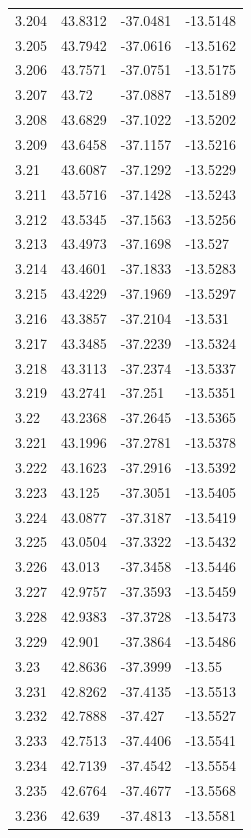 \begin{tabular}{llll}
3.204 & 43.8312 & -37.0481 & -13.5148 \\
3.205 & 43.7942 & -37.0616 & -13.5162 \\
3.206 & 43.7571 & -37.0751 & -13.5175 \\
3.207 & 43.72 & -37.0887 & -13.5189 \\
3.208 & 43.6829 & -37.1022 & -13.5202 \\
3.209 & 43.6458 & -37.1157 & -13.5216 \\
3.21 & 43.6087 & -37.1292 & -13.5229 \\
3.211 & 43.5716 & -37.1428 & -13.5243 \\
3.212 & 43.5345 & -37.1563 & -13.5256 \\
3.213 & 43.4973 & -37.1698 & -13.527 \\
3.214 & 43.4601 & -37.1833 & -13.5283 \\
3.215 & 43.4229 & -37.1969 & -13.5297 \\
3.216 & 43.3857 & -37.2104 & -13.531 \\
3.217 & 43.3485 & -37.2239 & -13.5324 \\
3.218 & 43.3113 & -37.2374 & -13.5337 \\
3.219 & 43.2741 & -37.251 & -13.5351 \\
3.22 & 43.2368 & -37.2645 & -13.5365 \\
3.221 & 43.1996 & -37.2781 & -13.5378 \\
3.222 & 43.1623 & -37.2916 & -13.5392 \\
3.223 & 43.125 & -37.3051 & -13.5405 \\
3.224 & 43.0877 & -37.3187 & -13.5419 \\
3.225 & 43.0504 & -37.3322 & -13.5432 \\
3.226 & 43.013 & -37.3458 & -13.5446 \\
3.227 & 42.9757 & -37.3593 & -13.5459 \\
3.228 & 42.9383 & -37.3728 & -13.5473 \\
3.229 & 42.901 & -37.3864 & -13.5486 \\
3.23 & 42.8636 & -37.3999 & -13.55 \\
3.231 & 42.8262 & -37.4135 & -13.5513 \\
3.232 & 42.7888 & -37.427 & -13.5527 \\
3.233 & 42.7513 & -37.4406 & -13.5541 \\
3.234 & 42.7139 & -37.4542 & -13.5554 \\
3.235 & 42.6764 & -37.4677 & -13.5568 \\
3.236 & 42.639 & -37.4813 & -13.5581 \\

\end{tabular}
